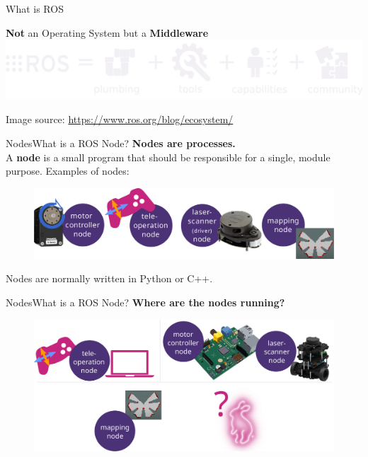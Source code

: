 \documentclass[aspectratio=169]{beamer}
\begin{document}
\begin{frame}{What is ROS}
    \begin{block}{\textbf{Not} an Operating System but a \textbf{Middleware}}
        \includegraphics[width=\textwidth]{figures/ros-equation.pdf}
    
        \hfill \tiny{Image source: \url{https://www.ros.org/blog/ecosystem/}}
      \end{block}
\end{frame}

\begin{frame}{Nodes}{What is a ROS Node?}
    \textbf{Nodes are processes.}\\
      A \textbf{node} is a small program that should be responsible for a single, module purpose. 
      Examples of nodes:    
      \begin{figure}[tbh!]
          \centering
        \includegraphics[width=.75\textwidth]{./figures/nodes.pdf}
      \end{figure}
      Nodes are normally written in Python or C++.
\end{frame}
  
  \begin{frame}{Nodes}{What is a ROS Node?}
    \textbf{Where are the nodes running?}\\
      \begin{figure}[tbh!]
        \centering
        \includegraphics[width=.9\textwidth]{./figures/where_should_a_node_run.pdf}
      \end{figure}
  \end{frame}
\end{document}
